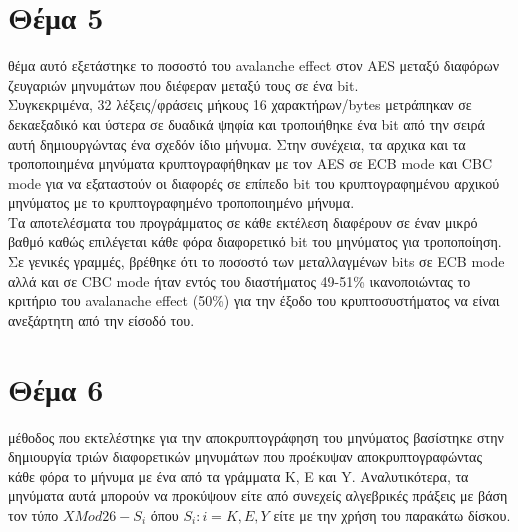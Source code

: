 \documentclass[a4paper, 11pt]{article}
\newcommand{\lt}{\latintext}
\newcommand\tab[1][1cm]{\hspace*{#1}}
\begin{document}
\section*{Θέμα 5}

 θέμα αυτό εξετάστηκε το ποσοστό του {\lt avalanche effect} στον {\lt AES} μεταξύ διαφόρων ζευγαριών μηνυμάτων που διέφεραν μεταξύ τους σε ένα {\lt bit}. \\
Συγκεκριμένα, 32 λέξεις/φράσεις μήκους 16 χαρακτήρων/{\lt bytes} μετράπηκαν σε δεκαεξαδικό και ύστερα σε δυαδικά ψηφία και τροποιήθηκε ένα {\lt bit} από την σειρά αυτή δημιουργώντας ένα σχεδόν ίδιο μήνυμα.
Στην συνέχεια, τα αρχικα και τα τροποποιημένα μηνύματα κρυπτογραφήθηκαν με τον {\lt AES} σε {\lt ECB mode} και {\lt CBC mode} για να εξαταστούν οι διαφορές σε επίπεδο {\lt bit} του κρυπτογραφημένου αρχικού μηνύματος με το κρυπτογραφημένο τροποποιημένο μήνυμα. \\
Τα αποτελέσματα του προγράμματος σε κάθε εκτέλεση διαφέρουν σε έναν μικρό βαθμό καθώς επιλέγεται κάθε φόρα διαφορετικό {\lt bit} του μηνύματος για τροποποίηση. 
Σε γενικές γραμμές, βρέθηκε ότι το ποσοστό των μεταλλαγμένων {\lt bits} σε {\lt ECB mode} αλλά και σε {\lt CBC mode} ήταν εντός του διαστήματος 49-51\% ικανοποιώντας το κριτήριο του {\lt avalanache effect} (50\%) για την έξοδο του κρυπτοσυστήματος να είναι ανεξάρτητη από την είσοδό του.




\newpage
\section*{Θέμα 6}

 μέθοδος που εκτελέστηκε για την αποκρυπτογράφηση του μηνύματος βασίστηκε στην δημιουργία τριών διαφορετικών μηνυμάτων που προέκυψαν αποκρυπτογραφώντας κάθε φόρα το μήνυμα με ένα από τα γράμματα {\lt K}, {\lt E} και {\lt Y}. 
Αναλυτικότερα, τα μηνύματα αυτά μπορούν να προκύψουν είτε από συνεχείς αλγεβρικές πράξεις με βάση τον τύπο $ X  Μod 26 - S_{i} $ όπου $S_{i} : i = {K, E, Y} $ είτε με την χρήση του παρακάτω δίσκου.
\end{document}
